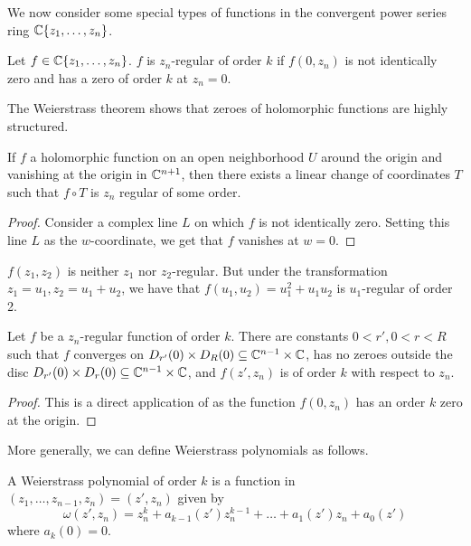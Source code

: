 We now consider some special types of functions in the convergent power series ring $\mathbb{C}\{z_{1},\dots,z_{n}\}$. 
\begin{definition}\label{def: regular of fixed order}
    Let $f\in\mathbb{C}\{z_{1},\dots,z_{n}\}$. $f$ is $z_{n}$-regular of order $k$ if $f(0,z_{n})$ is not identically zero and has a zero of order $k$ at $z_{n}=0$. 
\end{definition}
The Weierstrass theorem shows that zeroes of holomorphic functions are highly structured. 
\begin{lemma}\label{lem: regular transformations}
    If $f$ a holomorphic function on an open neighborhood $U$ around the origin and vanishing at the origin in $\mathbb{C}^{n+1}$, then there exists a linear change of coordinates $T$ such that $f\circ T$ is $z_{n}$ regular of some order. 
\end{lemma}
\begin{proof}
    Consider a complex line $L$ on which $f$ is not identically zero. Setting this line $L$ as the $w$-coordinate, we get that $f$ vanishes at $w=0$. 
\end{proof}
\begin{example}
    $f(z_{1},z_{2})$ is neither $z_{1}$ nor $z_{2}$-regular. But under the transformation $z_{1}=u_{1},z_{2}=u_{1}+u_{2}$, we have that $f(u_{1},u_{2})=u_{1}^{2}+u_{1}u_{2}$ is $u_{1}$-regular of order 2. 
\end{example}
\begin{lemma}\label{lem: order k function}
    Let $f$ be a $z_{n}$-regular function of order $k$. There are constants $0<r', 0<r<R$ such that $f$ converges on $D_{r'}(0)\times D_{R}(0)\subseteq\mathbb{C}^{n-1}\times\mathbb{C}$, has no zeroes outside the disc $D_{r'}(0)\times D_{r}(0)\subseteq\mathbb{C}^{n-1}\times\mathbb{C}$, and $f(z',z_{n})$ is of order $k$ with respect to $z_{n}$. 
\end{lemma}
\begin{proof}
    This is a direct application of  as the function $f(0,z_{n})$ has an order $k$ zero at the origin. 
\end{proof}
More generally, we can define Weierstrass polynomials as follows. 
\begin{definition}\label{def: Weierstrass polynomials}
    A Weierstrass polynomial of order $k$ is a function in $(z_{1},\dots,z_{n-1},z_{n})=(z',z_{n})$ given by 
    $$\omega(z',z_{n})=z_{n}^{k}+a_{k-1}(z')z_{n}^{k-1}+\dots+a_{1}(z')z_{n}+a_{0}(z')$$
    where $a_{k}(0)=0$. 
\end{definition}